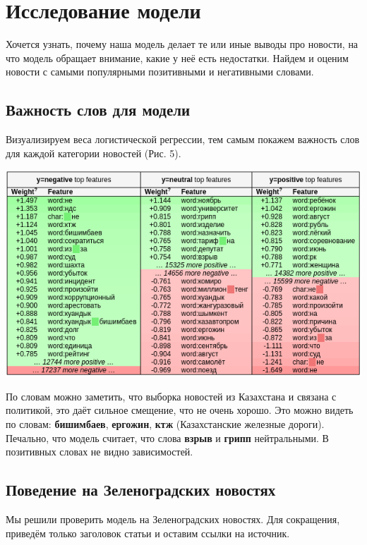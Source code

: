 \documentclass[12pt]{article}
\begin{document}
    \section{Исследование модели}
        
        Хочется узнать, почему наша модель делает те или иные выводы про новости, на что модель обращает внимание,
        какие у неё есть недостатки. Найдем и оценим новости с самыми популярными позитивными и негативными словами.

        \subsection{Важность слов для модели}
            Визуализируем веса логистической регрессии, тем самым покажем важность слов для каждой категории новостей (Рис. 5).

            \begin{center}
                \includegraphics[scale=0.8]{logreg_eli5}
            \end{center}

            По словам можно заметить, что выборка новостей из Казахстана и связана с политикой, это даёт сильное смещение, что не очень хорошо. 
            Это можно видеть по словам: \textbf{бишимбаев}, \textbf{ергожин}, \textbf{ктж} (Казахстанские железные дороги).
            Печально, что модель считает, что слова \textbf{взрыв} и \textbf{грипп} нейтральными. 
            В позитивных словах не видно зависимостей.
        
        \subsection{Поведение на Зеленоградских новостях}
            Мы решили проверить модель на Зеленоградских новостях.
            Для сокращения, приведём только заголовок статьи и оставим ссылки на источник.
\end{document}
